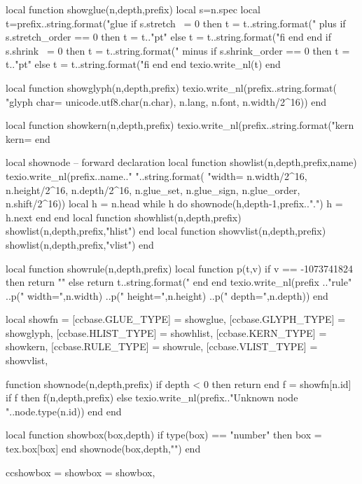
%
%
%
\luacode
local function showglue(n,depth,prefix)
  local s=n.spec
  local t=prefix..string.format("glue %
  if s.stretch ~= 0 then
    t = t..string.format(" plus %
    if s.stretch_order == 0 then t = t.."pt"
    else t = t..string.format("fi%
    end
  end
  if s.shrink ~= 0 then
    t = t..string.format(" minus %
    if s.shrink_order == 0 then t = t.."pt"
    else t = t..string.format("fi%
    end
  end
  texio.write_nl(t)
end

local function showglyph(n,depth,prefix)
  texio.write_nl(prefix..string.format(
    "glyph char=%
    unicode.utf8.char(n.char),
    n.lang, n.font, n.width/2^16))
end

local function showkern(n,depth,prefix)
  texio.write_nl(prefix..string.format("kern kern=%
end

local shownode -- forward declaration
local function showlist(n,depth,prefix,name)
  texio.write_nl(prefix..name.." "..string.format(
    "width=%
    n.width/2^16, n.height/2^16, n.depth/2^16,
    n.glue_set, n.glue_sign, n.glue_order,
    n.shift/2^16))
  local h = n.head
  while h do
    shownode(h,depth-1,prefix..".")
    h = h.next
  end
end
local function showhlist(n,depth,prefix) showlist(n,depth,prefix,"hlist") end
local function showvlist(n,depth,prefix) showlist(n,depth,prefix,"vlist") end

local function showrule(n,depth,prefix)
  local function p(t,v)
    if v == -1073741824 then return ""
    else return t..string.format("%
    end
  end
  texio.write_nl(prefix
    .."rule"
    ..p(" width=",n.width)
    ..p(" height=",n.height)
    ..p(" depth=",n.depth))
end

local showfn = {
  [ccbase.GLUE_TYPE]  = showglue,
  [ccbase.GLYPH_TYPE] = showglyph,
  [ccbase.HLIST_TYPE] = showhlist,
  [ccbase.KERN_TYPE]  = showkern,
  [ccbase.RULE_TYPE]  = showrule,
  [ccbase.VLIST_TYPE] = showvlist,
}

function shownode(n,depth,prefix)
  if depth < 0 then return end
  f = showfn[n.id]
  if f then
    f(n,depth,prefix)
  else
    texio.write_nl(prefix.."Unknown node "..node.type(n.id))
  end
end

local function showbox(box,depth)
  if type(box) == "number" then box = tex.box[box] end
  shownode(box,depth,"")
end

ccshowbox = {
  showbox = showbox,
}
\endluacode
\def\ccshowbox#1#2{\directlua{ccshowbox.showbox(#1,#2)}}
\endinput
